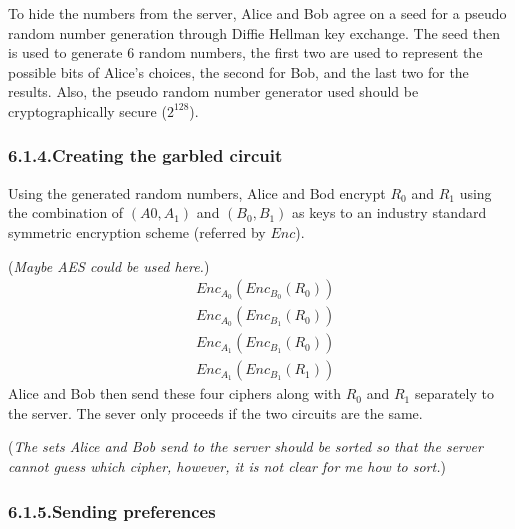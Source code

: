 \documentclass{article}
\begin{document}
\noindent{}To hide the numbers from the server, Alice and Bob agree on a seed for a pseudo random number generation through Diffie Hellman key exchange. The seed then is used to generate 6 random numbers, the first two are used to represent the possible bits of Alice’s choices, the second for Bob, and the last two for the results. Also, the pseudo random number generator used should be cryptographically secure ($2^{128}$).%

\subsubsection{6.1.4.\hspace*{0.5em}Creating the garbled circuit}\label{sec-creating-the-garbled-circuit}%

\noindent{}Using the generated random numbers, Alice and Bod encrypt $R_{0}$ and $R_{1}$ using the combination of $(A{0}, A_{1})$ and $(B_{0}, B_{1})$ as keys to an industry standard symmetric encryption scheme (referred by $Enc$).%

(\emph{Maybe AES could be used here.})%
\noindent\noindent\[%
\begin{aligned}
&Enc_{A_{0}}(Enc_{B_{0}}(R_{0})) \\
&Enc_{A_{0}}(Enc_{B_{1}}(R_{0})) \\
&Enc_{A_{1}}(Enc_{B_{1}}(R_{0})) \\
&Enc_{A_{1}}(Enc_{B_{1}}(R_{1}))
\end{aligned}
\]%
\noindent{}Alice and Bob then send these four ciphers along with $R_{0}$ and $R_{1}$ separately to the server. The sever only proceeds if the two circuits are the same. 

(\emph{The sets Alice and Bob send to the server should be sorted so that the server cannot guess which cipher, however, it is not clear for me how to sort.})%

\subsubsection{6.1.5.\hspace*{0.5em}Sending preferences}\label{sec-sending-preferences}%
\end{document}
